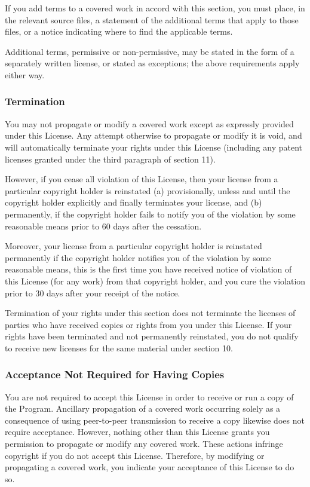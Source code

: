 \documentclass{ctexart}
\begin{document}
  If you add terms to a covered work in accord with this section, you
must place, in the relevant source files, a statement of the
additional terms that apply to those files, or a notice indicating
where to find the applicable terms.

  Additional terms, permissive or non-permissive, may be stated in the
form of a separately written license, or stated as exceptions;
the above requirements apply either way.

\subsubsection{Termination}

  You may not propagate or modify a covered work except as expressly
provided under this License.  Any attempt otherwise to propagate or
modify it is void, and will automatically terminate your rights under
this License (including any patent licenses granted under the third
paragraph of section 11).

  However, if you cease all violation of this License, then your
license from a particular copyright holder is reinstated (a)
provisionally, unless and until the copyright holder explicitly and
finally terminates your license, and (b) permanently, if the copyright
holder fails to notify you of the violation by some reasonable means
prior to 60 days after the cessation.

  Moreover, your license from a particular copyright holder is
reinstated permanently if the copyright holder notifies you of the
violation by some reasonable means, this is the first time you have
received notice of violation of this License (for any work) from that
copyright holder, and you cure the violation prior to 30 days after
your receipt of the notice.

  Termination of your rights under this section does not terminate the
licenses of parties who have received copies or rights from you under
this License.  If your rights have been terminated and not permanently
reinstated, you do not qualify to receive new licenses for the same
material under section 10.

\subsubsection{Acceptance Not Required for Having Copies}

  You are not required to accept this License in order to receive or
run a copy of the Program.  Ancillary propagation of a covered work
occurring solely as a consequence of using peer-to-peer transmission
to receive a copy likewise does not require acceptance.  However,
nothing other than this License grants you permission to propagate or
modify any covered work.  These actions infringe copyright if you do
not accept this License.  Therefore, by modifying or propagating a
covered work, you indicate your acceptance of this License to do so.
\end{document}
